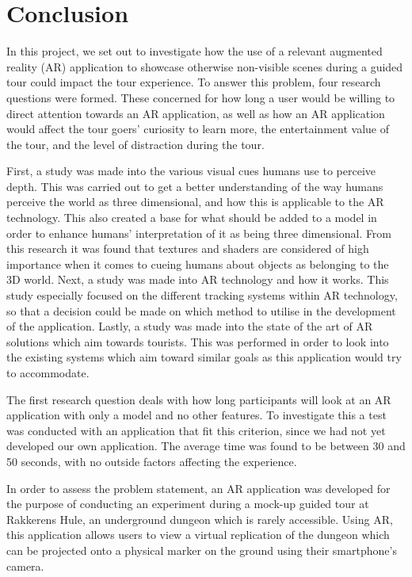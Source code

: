 \chapter{Conclusion}\label{ch:conclusion}
In this project, we set out to investigate how the use of a relevant augmented reality (AR) application to showcase otherwise non-visible scenes during a guided tour could impact the tour experience. To answer this problem, four research questions were formed. These concerned for how long a user would be willing to direct attention towards an AR application, as well as how an AR application would affect the tour goers’ curiosity to learn more, the entertainment value of the tour, and the level of distraction during the tour.

First, a study was made into the various visual cues humans use to perceive depth. This was carried out to get a better understanding of the way humans perceive the world as three dimensional, and how this is applicable to the AR technology. This also created a base for what should be added to a model in order to enhance humans’ interpretation of it as being three dimensional. From this research it was found that textures and shaders are considered of high importance when it comes to cueing humans about objects as belonging to the 3D world. Next, a study was made into AR technology and how it works. This study especially focused on the different tracking systems within AR technology, so that a decision could be made on which method to utilise in the development of the application.  Lastly, a study was made into the state of the art of AR solutions which aim towards tourists. This was performed in order to look into the existing systems which aim toward similar goals as this application would try to accommodate.

The first research question deals with how long participants will look at an AR application with only a model and no other features. To investigate this a test was conducted with an application that fit this criterion, since we had not yet developed our own application. The average time was found to be between 30 and 50 seconds, with no outside factors affecting the experience.

In order to assess the problem statement, an AR application was developed for the purpose of conducting an experiment during a mock-up guided tour at Rakkerens Hule, an underground dungeon which is rarely accessible. Using AR, this application allows users to view a virtual replication of the dungeon which can be projected onto a physical marker on the ground using their smartphone’s camera.

